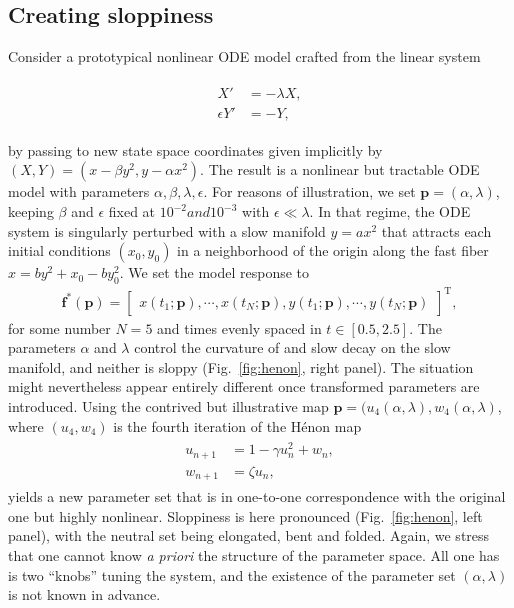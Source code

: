 \subsection{Creating sloppiness} \label{sec:hm} Consider a
prototypical nonlinear ODE model crafted from the linear system

\begin{align}
  \begin{aligned}
    X' &= -\lambda X , \\
    \epsilon Y' &= -Y ,
    \label{eqn:sp}
  \end{aligned}
\end{align}

by passing to new state space coordinates given implicitly by
$(X, Y) = (x-\beta y^2 , y - \alpha x^2)$.  The result is a nonlinear
but tractable ODE model with parameters
$\alpha,\beta,\lambda,\epsilon$.  For reasons of illustration, we set
$\mathbf{p} = (\alpha,\lambda)$, keeping $\beta$ and $\epsilon$ fixed at
$10^{-2} and 10^{-3}$ with $\epsilon \ll \lambda$.  In that regime,
the ODE system is singularly perturbed with a slow manifold
$y = a x^2$ that attracts each initial conditions $(x_0,y_0)$ in a
neighborhood of the origin along the fast fiber
$x = b y^2 + x_0 - b y_0^2$.  We set the model response to
\begin{align}
  \mathbf{f}^*(\mathbf{p}) = \begin{bmatrix} x(t_1;\mathbf{p}) , \cdots , x(t_{N};\mathbf{p}) , y(t_1;\mathbf{p}) , \cdots , y(t_{N};\mathbf{p}) \end{bmatrix}^\mathrm{T} ,
\end{align}
for some number $N=5$ and times evenly spaced in $t \in [0.5, 2.5]$.
The parameters $\alpha$ and $\lambda$ control the curvature of and
slow decay on the slow manifold, and neither is sloppy
(Fig.~\ref{fig:henon}, right panel).  The situation might nevertheless
appear entirely different once transformed parameters are introduced.
Using the contrived but illustrative map
$\mathbf{p} = (u_4(\alpha,\lambda), w_4(\alpha,\lambda)$, where
$(u_4,w_4)$ is the fourth iteration of the H\'{e}non map
\begin{align}
  \begin{aligned}
    u_{n+1} &= 1 - \gamma u_n^2 + w_n , \\
    w_{n+1} &= \zeta u_n ,
    \label{eqn:henon}
  \end{aligned}
\end{align}
yields a new parameter set that is in one-to-one correspondence with
the original one but highly nonlinear.  Sloppiness is here pronounced
(Fig.~\ref{fig:henon}, left panel), with the neutral set being
elongated, bent and folded.  Again, we stress that one cannot know
\textit{a priori} the structure of the parameter space.  All one has
is two ``knobs'' tuning the system, and the existence of the parameter
set $(\alpha,\lambda)$ is not known in advance.

